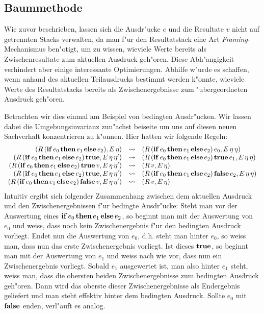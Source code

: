 \documentclass[12pt,a4paper]{article}
\begin{document}
\subsection{Baummethode}

Wie zuvor beschrieben, lassen sich die Ausdr"ucke $e$ und die Resultate $v$ nicht auf getrennten Stacks
verwalten, da man f"ur den Resultatstack eine Art \emph{Framing}-Mechanismus ben"otigt, um zu wissen,
wieviele Werte bereits als Zwischenresultate zum aktuellen Ausdruck geh"oren. Diese Abh"angigkeit
verhindert aber einige interessante Optimierungen. Abhilfe w"urde es schaffen, wenn anhand des aktuellen
Teilausdrucks bestimmt werden k"onnte, wieviele Werte des Resultatstacks bereits als Zwischenergebnisse
zum "ubergeordneten Ausdruck geh"oren.

Betrachten wir dies einmal am Beispiel von bedingten Ausdr"ucken. Wir lassen dabei die Umgebungsinvarianz
zun"achst beiseite um uns auf diesen neuen Sachverhalt konzentrieren zu k"onnen. Hier hatten wir folgende
Regeln:
\[\begin{array}{rcl}
  (R\,(\mathbf{if}\,{e_0}\,\mathbf{then}\,{e_1}\,\mathbf{else}\,{e_2}),E\,\eta)
  &\rightsquigarrow& (R\,(\mathbf{if}\,{e_0}\,\mathbf{then}\,{e_1}\,\mathbf{else}\,{e_2})\,e_0,E\,\eta\,\eta) \\
  (R\,(\mathbf{if}\,{e_0}\,\mathbf{then}\,{e_1}\,\mathbf{else}\,{e_2})\,\mathbf{true},E\,\eta\,\eta')
  &\rightsquigarrow& (R\,(\mathbf{if}\,{e_0}\,\mathbf{then}\,{e_1}\,\mathbf{else}\,{e_2})\,\mathbf{true}\,e_1,E\,\eta\,\eta) \\
  (R\,(\mathbf{if}\,{e_0}\,\mathbf{then}\,{e_1}\,\mathbf{else}\,{e_2})\,\mathbf{true}\,v,E\,\eta\,\eta')
  &\rightsquigarrow& (R\,v,E\,\eta) \\
  (R\,(\mathbf{if}\,{e_0}\,\mathbf{then}\,{e_1}\,\mathbf{else}\,{e_2})\,\mathbf{true},E\,\eta\,\eta')
  &\rightsquigarrow& (R\,(\mathbf{if}\,{e_0}\,\mathbf{then}\,{e_1}\,\mathbf{else}\,{e_2})\,\mathbf{false}\,e_2,E\,\eta\,\eta) \\
  (R\,(\mathbf{if}\,{e_0}\,\mathbf{then}\,{e_1}\,\mathbf{else}\,{e_2})\,\mathbf{false}\,v,E\,\eta\,\eta')
  &\rightsquigarrow& (R\,v,E\,\eta) \\
\end{array}\]
Intuitiv ergibt sich folgender Zusammenhang zwischen dem aktuellen Ausdruck und den Zwischenergebnissen
f"ur bedingte Ausdr"ucke: Steht man vor der Auswertung eines $\mathbf{if}\,{e_0}\,\mathbf{then}\,{e_1}\,\mathbf{else}\,{e_2}$, so beginnt man mit
der Auswertung von $e_0$ und weiss, dass noch kein Zwischenergebnis f"ur den bedingten Ausdruck
vorliegt. Endet nun die Auswertung von $e_0$, d.h. steht man hinter $e_0$, so weiss man, dass nun das
erste Zwischenergebnis vorliegt. Ist dieses $\mathbf{true}$, so beginnt man mit der Auswertung von $e_1$ und
weiss nach wie vor, dass nun ein Zwischenergebnis vorliegt. Sobald $e_1$ ausgewertet ist, man also
hinter $e_1$ steht, weiss man, dass die obersten beiden Zwischenergebnisse zum bedingten Ausdruck
geh"oren. Dann wird das oberste dieser Zwischenergebnisse als Endergebnis geliefert und man steht
effektiv hinter dem bedingten Ausdruck. Sollte $e_0$ mit $\mathbf{false}$ enden, verl"auft es analog.
\end{document}
